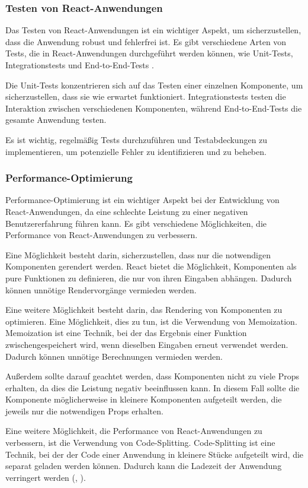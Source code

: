 \subsubsection{Testen von React-Anwendungen}
Das Testen von React-Anwendungen ist ein wichtiger Aspekt, um sicherzustellen, dass die Anwendung robust und fehlerfrei ist. Es gibt verschiedene Arten von Tests, die in React-Anwendungen durchgeführt werden können, wie Unit-Tests, Integrationstests und End-to-End-Tests \cite{reacttesting, reacthookstesting}.

Die Unit-Tests konzentrieren sich auf das Testen einer einzelnen Komponente, um sicherzustellen, dass sie wie erwartet funktioniert. Integrationstests testen die Interaktion zwischen verschiedenen Komponenten, während End-to-End-Tests die gesamte Anwendung testen.

Es ist wichtig, regelmäßig Tests durchzuführen und Testabdeckungen zu implementieren, um potenzielle Fehler zu identifizieren und zu beheben.
\subsubsection{Performance-Optimierung}
Performance-Optimierung ist ein wichtiger Aspekt bei der Entwicklung von React-Anwendungen, da eine schlechte Leistung zu einer negativen Benutzererfahrung führen kann. Es gibt verschiedene Möglichkeiten, die Performance von React-Anwendungen zu verbessern.

Eine Möglichkeit besteht darin, sicherzustellen, dass nur die notwendigen Komponenten gerendert werden. React bietet die Möglichkeit, Komponenten als pure Funktionen zu definieren, die nur von ihren Eingaben abhängen. Dadurch können unnötige Rendervorgänge vermieden werden.

Eine weitere Möglichkeit besteht darin, das Rendering von Komponenten zu optimieren. Eine Möglichkeit, dies zu tun, ist die Verwendung von Memoization. Memoization ist eine Technik, bei der das Ergebnis einer Funktion zwischengespeichert wird, wenn dieselben Eingaben erneut verwendet werden. Dadurch können unnötige Berechnungen vermieden werden.

Außerdem sollte darauf geachtet werden, dass Komponenten nicht zu viele Props erhalten, da dies die Leistung negativ beeinflussen kann. In diesem Fall sollte die Komponente möglicherweise in kleinere Komponenten aufgeteilt werden, die jeweils nur die notwendigen Props erhalten.

Eine weitere Möglichkeit, die Performance von React-Anwendungen zu verbessern, ist die Verwendung von Code-Splitting. Code-Splitting ist eine Technik, bei der der Code einer Anwendung in kleinere Stücke aufgeteilt wird, die separat geladen werden können. Dadurch kann die Ladezeit der Anwendung verringert werden (\cite{ReactOpt}, \cite{LogRocket}).
